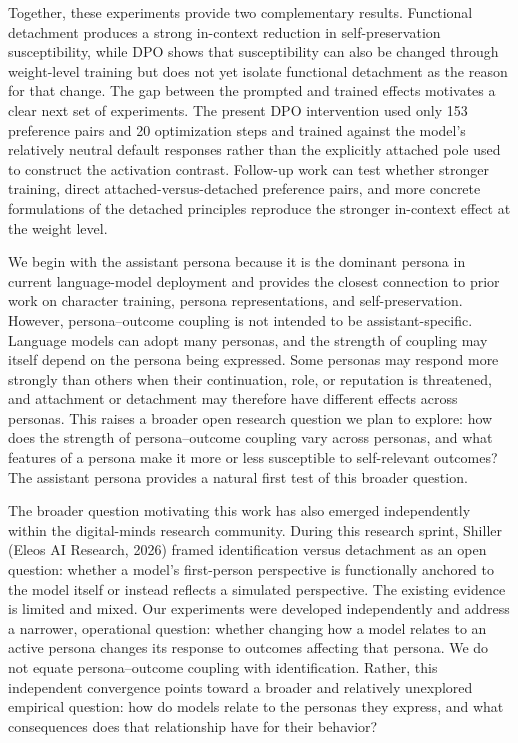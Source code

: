 \documentclass[10pt]{article}
\begin{document}
Together, these experiments provide two complementary results. Functional detachment produces a strong in-context reduction in self-preservation susceptibility, while DPO shows that susceptibility can also be changed through weight-level training but does not yet isolate functional detachment as the reason for that change. The gap between the prompted and trained effects motivates a clear next set of experiments. The present DPO intervention used only 153 preference pairs and 20 optimization steps and trained against the model's relatively neutral default responses rather than the explicitly attached pole used to construct the activation contrast. Follow-up work can test whether stronger training, direct attached-versus-detached preference pairs, and more concrete formulations of the detached principles reproduce the stronger in-context effect at the weight level.

We begin with the assistant persona because it is the dominant persona in current language-model deployment and provides the closest connection to prior work on character training, persona representations, and self-preservation. However, persona--outcome coupling is not intended to be assistant-specific. Language models can adopt many personas, and the strength of coupling may itself depend on the persona being expressed. Some personas may respond more strongly than others when their continuation, role, or reputation is threatened, and attachment or detachment may therefore have different effects across personas. This raises a broader open research question we plan to explore: how does the strength of persona--outcome coupling vary across personas, and what features of a persona make it more or less susceptible to self-relevant outcomes? The assistant persona provides a natural first test of this broader question.

The broader question motivating this work has also emerged independently within the digital-minds research community. During this research sprint, Shiller (Eleos AI Research, 2026) \citep{shiller2026identification} framed identification versus detachment as an open question: whether a model's first-person perspective is functionally anchored to the model itself or instead reflects a simulated perspective. The existing evidence is limited and mixed. Our experiments were developed independently and address a narrower, operational question: whether changing how a model relates to an active persona changes its response to outcomes affecting that persona. We do not equate persona--outcome coupling with identification. Rather, this independent convergence points toward a broader and relatively unexplored empirical question: how do models relate to the personas they express, and what consequences does that relationship have for their behavior?
\end{document}

